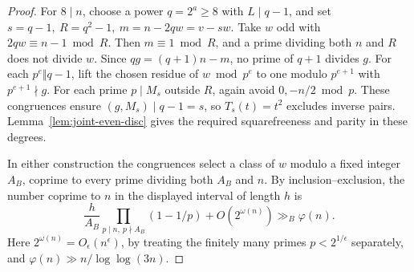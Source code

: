 \documentclass[11pt]{article}
\begin{document}
\begin{proof}
For \(8\mid n\), choose a power \(q=2^a\ge8\) with \(L\mid q-1\),
and set \(s=q-1,\ R=q^2-1,\ m=n-2qw=v-sw\).
Take \(w\) odd with \(2qw\equiv n-1\bmod R\).
Then \(m\equiv1\bmod R\), and a prime dividing both \(n\) and \(R\)
does not divide \(w\). Since \(qg=(q+1)n-m\), no prime of \(q+1\)
divides \(g\). For each \(p^e\Vert q-1\), lift the chosen residue of
\(w\bmod p^e\) to one modulo \(p^{e+1}\) with \(p^{e+1}\nmid g\).
For each prime \(p\mid M_s\) outside \(R\), again avoid \(0,-n/2\bmod p\).
These congruences ensure \((g,M_s)\mid q-1=s\), so \(T_s(t)=t^2\)
excludes inverse pairs. Lemma~\ref{lem:joint-even-disc} gives the
required squarefreeness and parity in these degrees.

In either construction the congruences select a class of \(w\)
modulo a fixed integer \(A_B\), coprime to every prime dividing
both \(A_B\) and \(n\). By inclusion--exclusion, the number coprime
to \(n\) in the displayed interval of length \(h\) is
\[
 \frac{h}{A_B}\prod_{p\mid n,\ p\nmid A_B}(1-1/p)
       +O(2^{\omega(n)})\gg_B\varphi(n).
\]
Here \(2^{\omega(n)}=O_\epsilon(n^\epsilon)\), by treating the
finitely many primes \(p<2^{1/\epsilon}\) separately, and
\(\varphi(n)\gg n/\log\log(3n)\).
\end{proof}
\end{document}
